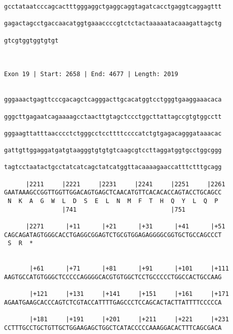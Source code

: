 \documentclass{article}
\begin{document}
\begin{Verbatim}
gcctataatcccagcactttgggaggctgaggcaggtagatcacctgaggtcaggagttt
                                                            
gagactagcctgaccaacatggtgaaaccccgtctctactaaaaatacaaagattagctg
                                                            
gtcgtggtggtgtgt
               
               
 
Exon 19 | Start: 2658 | End: 4677 | Length: 2019


gggaaactgagttcccgacagctcagggacttgcacatggtcctgggtgaaggaaacaca
                                                            
gggcttgagaatcagaaaagcctaacttgtagctccctggcttattagccgtgtggcctt
                                                            
gggaagttatttaacccctctgggcctccttttccccatctgtgagacagggataaacac
                                                            
gattgttggaggatgatgtaagggtgtgtgtcaagcgtccttaggatggtgcctggcggg
                                                            
tagtcctaatactgcctatcatcagctatcatggttacaaaagaaccatttctttgcagg
                                                            
      |2211     |2221     |2231     |2241     |2251     |2261
GAATAAAGCCGGTTGGTTGGACAGTGAGCTCAACATGTTCACACACCAGTACCTGCAGCC
 N  K  A  G  W  L  D  S  E  L  N  M  F  T  H  Q  Y  L  Q  P 
                |741                          |751          
  
      |2271      |+11      |+21      |+31      |+41      |+51
CAGCAGATAGTGGGCACCTGAGGCGGAGTCTGCGTGGAGAGGGGCGGTGCTGCCAGCCCT
 S  R  *                                                    
                                                            
  
       |+61      |+71      |+81      |+91      |+101     |+111
AAGTGCCATGTGGGCTCCCCCAGGGGCACGTGTGGCTCCTGCCCCCTGGCCACTGCCAAG
                                                            
       |+121     |+131     |+141     |+151     |+161     |+171
AGAATGAAGCACCCAGTCTCGTACCATTTTGAGCCCTCCAGCACTACTTATTTTCCCCCA
                                                            
       |+181     |+191     |+201     |+211     |+221     |+231
CCTTTGCCTGCTGTTGCTGGAAGAGCTGGCTCATACCCCCAAAGGACACTTTCAGCGACA
                                                            

\end{Verbatim}
\end{document}
